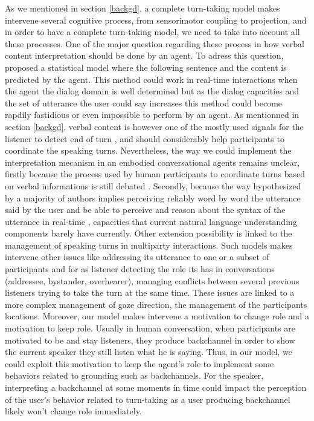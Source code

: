 As we mentioned in section \ref{backgd}, a complete turn-taking model makes intervene several cognitive process, from sensorimotor coupling to projection, and in order to have a complete turn-taking model, we need to take into account all these processes. One of the major question regarding these process in how verbal content interpretation should be done by an agent. To adress this question, \cite{de_vault_incremental_2011} proposed a statistical model where the following sentence and the content is predicted by the agent. This method could work in real-time interactions when the agent the dialog domain is well determined but as the dialog capacities and the set of utterance the user could say increases this method could become rapdily fastidious or even impossible to perform by an agent. 
As mentionned in section \ref{backgd}, verbal content is however one of the mostly used signals for the listener to detect end of turn \cite{de_ruiter_projecting_2006}, and should considerably help participants to coordinate the speaking turns. Nevertheless, the way we could implement the interpretation mecanism in an embodied conversational agents remains unclear, firstly because the process used by human participants to coordinate turns based on verbal informations is still debated \citep{heldner_pauses_2010,magyari_prediction_2012,riest_anticipation_2015}. Secondly, because the way hypothesized by a majority of authors implies perceiving reliably word by word the utterance said by the user and be able to perceive and reason about the syntax of the utterance in real-time \citep{sacks_simplest_1974}, capacities that current natural language understanding components barely have currently. 
Other extension possibility is linked to the management of speaking turns in multiparty interactions. Such models makes intervene other issues like addressing its utterance to one or a subset of participants and for as listener detecting the role its has in conversations (addressee, bystander, overhearer), managing conflicts between several previous listeners trying to take the turn at the same time. These issues are linked to a more complex management of gaze direction, the management of the participants locations. 
Moreover, our model makes intervene a motivation to change role and a motivation to keep role. Usually in human conversation, when participants are motivated to be and stay listeners, they produce backchannel in order to show the current speaker they still listen what he is saying. Thus, in our model, we could exploit this motivation to keep the agent's role to implement some behaviors related to grounding such as backchannels. For the speaker, interpreting a backchannel at some moments in time could impact the perception of the user's behavior related to turn-taking as a user producing backchannel likely won't change role immediately.

% 
